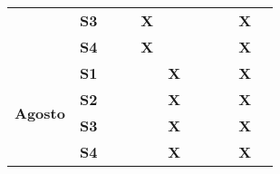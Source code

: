 \begin{table}[]
\begin{tabular}{|clllclllllllllll|}
\\ \cline{5-15} 
\multicolumn{4}{|c|}{}                                   & \multicolumn{3}{c|}{\textbf{S3}}                      & \multicolumn{1}{l|}{\textbf{}}  & \multicolumn{1}{l|}{\textbf{}}  & \multicolumn{1}{l|}{\textbf{X}}  & \multicolumn{1}{l|}{\textbf{}}  & \multicolumn{1}{l|}{\textbf{}} & \multicolumn{1}{l|}{\textbf{}}  & \multicolumn{1}{l|}{\textbf{}}  & \multicolumn{1}{l|}{\textbf{X}}
\\ \cline{5-15} 
\multicolumn{4}{|c|}{}                                   & \multicolumn{3}{c|}{\textbf{S4}}                      & \multicolumn{1}{l|}{\textbf{}}  & \multicolumn{1}{l|}{\textbf{}}  & \multicolumn{1}{l|}{\textbf{X}}  & \multicolumn{1}{l|}{\textbf{}}  & \multicolumn{1}{l|}{\textbf{}} & \multicolumn{1}{l|}{\textbf{}}  & \multicolumn{1}{l|}{\textbf{}}  & \multicolumn{1}{l|}{\textbf{X}}
\\ \hline
\multicolumn{4}{|c|}{\multirow{4}{*}{\textbf{Agosto}}}   & \multicolumn{3}{c|}{\textbf{S1}}                      & \multicolumn{1}{l|}{\textbf{}}  & \multicolumn{1}{l|}{\textbf{}}  & \multicolumn{1}{l|}{\textbf{}}  & \multicolumn{1}{l|}{\textbf{X}}  & \multicolumn{1}{l|}{\textbf{}} & \multicolumn{1}{l|}{\textbf{}}  & \multicolumn{1}{l|}{\textbf{}}  & \multicolumn{1}{l|}{\textbf{X}}
\\ \cline{5-15} 
\multicolumn{4}{|c|}{}                                   & \multicolumn{3}{c|}{\textbf{S2}}                      & \multicolumn{1}{l|}{\textbf{}}  & \multicolumn{1}{l|}{\textbf{}}  & \multicolumn{1}{l|}{\textbf{}}  & \multicolumn{1}{l|}{\textbf{X}}  & \multicolumn{1}{l|}{\textbf{}}  & \multicolumn{1}{l|}{\textbf{}} & \multicolumn{1}{l|}{\textbf{}}  & \multicolumn{1}{l|}{\textbf{X}}
\\ \cline{5-15} 
\multicolumn{4}{|c|}{}                                   & \multicolumn{3}{c|}{\textbf{S3}}                      & \multicolumn{1}{l|}{\textbf{}}  & \multicolumn{1}{l|}{\textbf{}}  & \multicolumn{1}{l|}{\textbf{}}  & \multicolumn{1}{l|}{\textbf{X}}  & \multicolumn{1}{l|}{\textbf{}}  & \multicolumn{1}{l|}{\textbf{}} & \multicolumn{1}{l|}{\textbf{}}  & \multicolumn{1}{l|}{\textbf{X}}
\\ \cline{5-15} 
\multicolumn{4}{|c|}{}                                   & \multicolumn{3}{c|}{\textbf{S4}}                      & \multicolumn{1}{l|}{\textbf{}}  & \multicolumn{1}{l|}{\textbf{}}  & \multicolumn{1}{l|}{\textbf{}}  & \multicolumn{1}{l|}{\textbf{X}}  & \multicolumn{1}{l|}{\textbf{}}  & \multicolumn{1}{l|}{\textbf{}} & \multicolumn{1}{l|}{\textbf{}}  & \multicolumn{1}{l|}{\textbf{X}}

\end{tabular}
\end{table}
